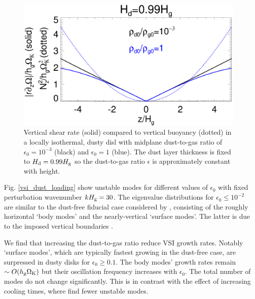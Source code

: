 \begin{figure}
  \includegraphics[width=\linewidth]{figures/compare_vshear_Nz2_fixHd} 
  \caption{Vertical shear rate (solid) compared to vertical buoyancy
    (dotted) in a locally isothermal, dusty disl with midplane dust-to-gas ratio
    of $\epsilon_0=10^{-3}$ (black) and $\epsilon_0=1$ (blue). 
    The dust layer thickness is fixed to $H_\mathrm{d}=0.99H_\mathrm{g}$ so the 
    dust-to-gas ratio $\epsilon$ is approximately constant with
    height. 
    \label{compare_vshear_fixHd}
    }
\end{figure}

Fig. \ref{vsi_dust_loading} show unstable modes for different values
of $\epsilon_0$ with fixed perturbation wavenumber  $kH_\mathrm{g} = 30$. The
eigenvalue distributions for $\epsilon_0 \leq 10^{-2}$ are similar to the
dust-free fiducial case considered by , consisting
of the roughly horizontal `body modes' and the nearly-vertical
`surface modes'. The latter is due to the imposed vertical boundaries
\citep{barker15}.  

We find that increasing the dust-to-gas ratio reduce VSI growth
rates. Notably `surface modes', which are typically fastest growing in
the dust-free case, are surpressed in dusty disks for $\epsilon_0\geq
0.1$. The body modes' growth rates remain $\sim O(h_\mathrm{g}\Omega_{\rm K})$
but their oscillation frequency increases with
$\epsilon_0$. The total number of modes do not change
significantly. This is in contrast with the effect of increasing
cooling times, where  find fewer unstable modes.

